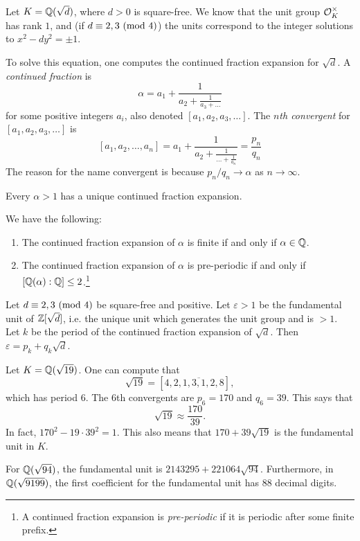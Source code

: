 \begin{example}
  Let $K = \mathbb{Q}(\sqrt{d})$, where $d > 0$ is square-free.
  We know that the unit group $\mathcal{O}_K^\times$ has rank
  $1$, and (if $d \equiv 2, 3 \ (\mathrm{mod}\ 4)$) the units
  correspond to the integer solutions
  to $x^2 - d y^2 = \pm 1$.

  To solve this equation, one computes the continued
  fraction expansion for $\sqrt{d}$. A \emph{continued
  fraction} is
  \[
    \alpha = a_1 + \frac{1}{a_2 + \displaystyle \frac{1}{a_3 + \dots}}
  \]
  for some positive integers $a_i$, also denoted
  $[a_1, a_2, a_3, \dots]$. The \emph{$n$th convergent}
  for $[a_1, a_2, a_3, \dots]$ is
  \[
    [a_1, a_2, \dots, a_n] =
    a_1 + \frac{1}{a_2 + \displaystyle \frac{1}{\dots + \displaystyle \frac{1}{a_n}}} = \frac{p_n}{q_n}
  \]
  The reason for the name convergent is because
  $p_n / q_n \to \alpha$ as $n \to \infty$.
\end{example}

\begin{theorem}
  Every $\alpha > 1$ has a unique continued fraction
  expansion.
\end{theorem}

\begin{theorem}
  We have the following:
  \begin{enumerate}
    \item The continued fraction expansion of $\alpha$
      is finite if and only if $\alpha \in \mathbb{Q}$.
    \item The continued fraction expansion of $\alpha$
      is pre-periodic if and only if
      $[\mathbb{Q}(\alpha) : \mathbb{Q}] \le 2$.\footnote{A continued fraction expansion is \emph{pre-periodic} if it is periodic after some finite prefix.}
  \end{enumerate}
\end{theorem}

\begin{theorem}
  Let $d \equiv 2, 3 \ (\mathrm{mod}\ 4)$ be square-free and
  positive. Let $\varepsilon > 1$ be the
  fundamental unit of $\mathbb{Z}[\sqrt{d}]$, i.e.
  the unique unit which generates the unit group
  and is $> 1$. Let $k$ be the period of the
  continued fraction expansion of $\sqrt{d}$. Then
  $\varepsilon = p_k + q_k \sqrt{d}$.
\end{theorem}

\begin{example}
  Let $K = \mathbb{Q}(\sqrt{19})$. One can compute that
  \[
    \sqrt{19} = [4, \overline{2, 1, 3, 1, 2, 8}],
  \]
  which has period $6$. The $6$th convergents
  are $p_6 = 170$ and $q_6 = 39$. This says that
  \[
    \sqrt{19} \approx \frac{170}{39}.
  \]
  In fact, $170^2 - 19 \cdot 39^2 = 1$. This also
  means that $170 + 39 \sqrt{19}$ is the fundamental
  unit in $K$.
\end{example}

\begin{remark}
  For $\mathbb{Q}(\sqrt{94})$, the fundamental unit is
  $2143295 + 221064\sqrt{94}$. Furthermore, in
  $\mathbb{Q}(\sqrt{9199})$, the first coefficient for
  the fundamental unit has $88$ decimal digits.
\end{remark}
